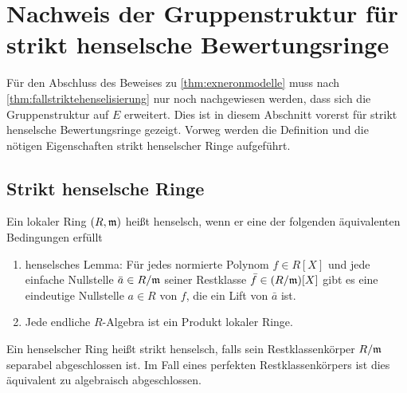 \section[Gruppenstruktur für strikt henselsche Ringe]%
{Nachweis der Gruppenstruktur für strikt henselsche Bewertungsringe}
\label{chap:gruppestrikthenselsch}
Für den Abschluss des Beweises zu \ref{thm:exneronmodelle} muss
nach \ref{thm:fallstriktehenselisierung} nur noch nachgewiesen werden,
dass sich die Gruppenstruktur auf $E$ erweitert.
Dies ist in diesem Abschnitt vorerst für strikt henselsche
Bewertungsringe gezeigt. Vorweg werden die Definition und die nötigen
Eigenschaften strikt henselscher Ringe aufgeführt.
\subsection{Strikt henselsche Ringe}
\begin{Definition}\label{def:henselscheringe}
  Ein lokaler Ring $(R,\mathfrak{m})$ heißt henselsch, wenn
  er eine der folgenden äquivalenten Bedingungen erfüllt
  \begin{enumerate}[label=(\roman*)]
  \item henselsches Lemma:
    Für jedes normierte Polynom $f\in R[X]$ und jede einfache Nullstelle
    $\bar a\in R/\mathfrak{m}$ seiner Restklasse $\bar f\in (R/\mathfrak{m})[X]$
    gibt es eine eindeutige Nullstelle ${a\in R}$ von $f$, die ein Lift
    von $\bar a$ ist.
  \item Jede endliche $R$-Algebra ist ein Produkt lokaler Ringe.
  \end{enumerate}
  Ein henselscher Ring heißt strikt henselsch, falls sein
  Restklassenkörper $R/\mathfrak{m}$ separabel abgeschlossen ist.
  Im Fall eines perfekten Restklassenkörpers ist dies äquivalent zu
  algebraisch abgeschlossen.
\end{Definition}

  

